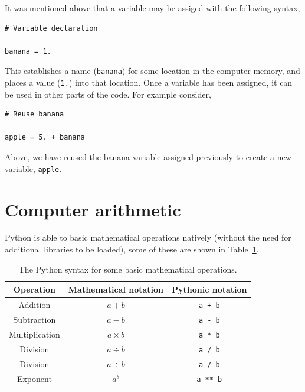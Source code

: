 \documentclass[a4paper]{article}
\begin{document}
It was mentioned above that a variable may be assiged with the following syntax,
\begin{lstlisting}
# Variable declaration

banana = 1.
\end{lstlisting}
This establishes a name (\texttt{banana}) for some location in the computer memory, and places a value (\texttt{1.}) into that location.
Once a variable has been assigned, it can be used in other parts of the code.
For example consider, 
\begin{lstlisting}
# Reuse banana

apple = 5. + banana
\end{lstlisting}
Above, we have reused the banana variable assigned previously to create a new variable, \texttt{apple}. 
\vspace{\baselineskip}
\begin{center}
	\noindent{}
\end{center}

\section{Computer arithmetic}

Python is able to basic mathematical operations natively (without the need for additional libraries to be loaded), some of these are shown in Table~\ref{tab:ops}.
\begin{table}[h]
	\centering
	\caption{The Python syntax for some basic mathematical operations.}
	\label{tab:ops}
	\begin{tabular}{c c c}
		\hline
		Operation & Mathematical notation & Pythonic notation \\
		\hline
		Addition & $a + b$ & \texttt{a + b} \\
		Subtraction & $a - b$ & \texttt{a - b} \\
		Multiplication & $a \times b$ & \texttt{a * b} \\
		Division & $a \div b$ & \texttt{a / b} \\
		Division & $a \div b$ & \texttt{a / b} \\
		Exponent & $a^b$ & \texttt{a ** b} \\
		\hline
	\end{tabular}
\end{table}
\end{document}
